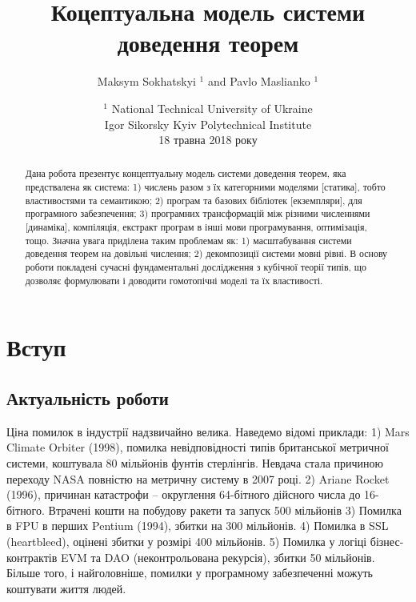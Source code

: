 \documentclass{article}
\begin{document}
\title{Коцептуальна модель системи доведення теорем}
\author{Maksym Sokhatskyi $^1$ and Pavlo Maslianko $^1$}
\date{
    $^1$ National Technical University of Ukraine \\
    \small Igor Sikorsky Kyiv Polytechnical Institute\\
    \small 18 травна 2018 року
}

\maketitle

\begin{abstract}
Дана робота презентує концептуальну модель системи доведення теорем, яка предствалена як система:
1) числень разом з їх категорними моделями [статика], тобто властивостями та семантикою;
2) програм та базових бібліотек [екземпляри], для програмного забезпечення;
3) програмних трансформацій між різними численнями [динаміка], компіляція, екстракт програм в інші мови програмування, оптимізація, тощо.
Значна увага приділена таким проблемам як: 1) масштабування системи доведення теорем
на довільні числення; 2) декомпозиції системи мовні рівні.
В основу роботи покладені сучасні фундаментальні дослідження з кубічної теорії типів,
що дозволяє формулювати і доводити гомотопічні моделі та їх властивості.
\end{abstract}

\newpage
\tableofcontents
\newpage

\section{Вступ}

\subsection{Актуальність роботи}
Ціна помилок в індустрії надзвичайно велика. Наведемо
відомі приклади: 1) Mars Climate Orbiter (1998), помилка невідповідності
типів британської метричної системи, коштувала 80 мільйонів фунтів стерлінгів.
Невдача стала причиною переходу NASA повністю на метричну систему в 2007 році.
2) Ariane Rocket (1996), причинан катастрофи -- округлення 64-бітного дійсного
числа до 16-бітного. Втрачені кошти на побудову ракети та запуск 500 мільйонів
3) Помилка в FPU в перших Pentium (1994), збитки на 300 мільйонів.
4) Помилка в SSL (heartbleed), оцінені збитки у розмірі 400 мільйонів.
5) Помилка у логіці бізнес-контрактів EVM та
DAO (неконтрольована рекурсія), збитки 50 мільйонів.
Більше того, і найголовніше, помилки у програмному забезпеченні можуть
коштувати життя людей.
\end{document}
